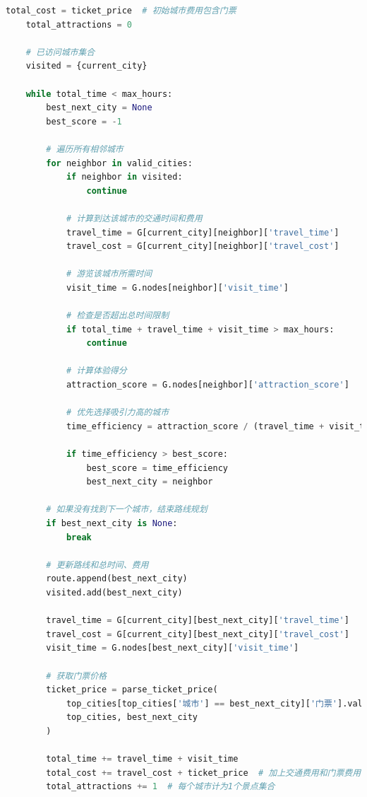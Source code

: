 \documentclass[withoutpreface,bwprint]{cumcmthesis} %
\begin{document}
\begin{appendices}
\begin{lstlisting}[language=python]
    total_cost = ticket_price  # 初始城市费用包含门票
    total_attractions = 0
    
    # 已访问城市集合
    visited = {current_city}
    
    while total_time < max_hours:
        best_next_city = None
        best_score = -1
        
        # 遍历所有相邻城市
        for neighbor in valid_cities:
            if neighbor in visited:
                continue
                
            # 计算到达该城市的交通时间和费用
            travel_time = G[current_city][neighbor]['travel_time']
            travel_cost = G[current_city][neighbor]['travel_cost']
            
            # 游览该城市所需时间
            visit_time = G.nodes[neighbor]['visit_time']
            
            # 检查是否超出总时间限制
            if total_time + travel_time + visit_time > max_hours:
                continue
                
            # 计算体验得分
            attraction_score = G.nodes[neighbor]['attraction_score']
            
            # 优先选择吸引力高的城市
            time_efficiency = attraction_score / (travel_time + visit_time)
            
            if time_efficiency > best_score:
                best_score = time_efficiency
                best_next_city = neighbor
        
        # 如果没有找到下一个城市，结束路线规划
        if best_next_city is None:
            break
            
        # 更新路线和总时间、费用
        route.append(best_next_city)
        visited.add(best_next_city)
        
        travel_time = G[current_city][best_next_city]['travel_time']
        travel_cost = G[current_city][best_next_city]['travel_cost']
        visit_time = G.nodes[best_next_city]['visit_time']
        
        # 获取门票价格
        ticket_price = parse_ticket_price(
            top_cities[top_cities['城市'] == best_next_city]['门票'].values[0] if best_next_city in top_cities['城市'].values else None,
            top_cities, best_next_city
        )
        
        total_time += travel_time + visit_time
        total_cost += travel_cost + ticket_price  # 加上交通费用和门票费用
        total_attractions += 1  # 每个城市计为1个景点集合
        

\end{lstlisting}
\end{appendices}
\end{document}
